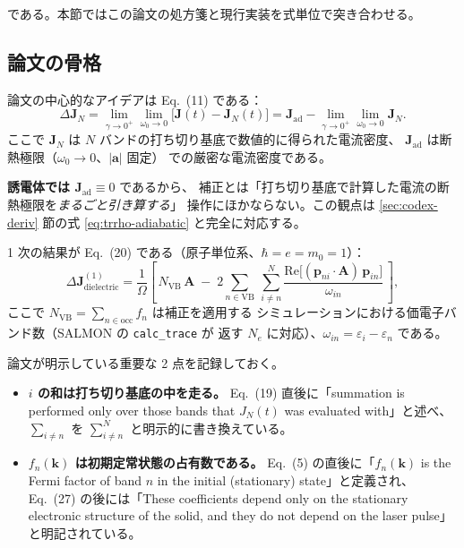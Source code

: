 \documentclass[dvipdfmx,a4paper,11pt]{jsarticle}
\newcommand{\vk}{\bm{k}}
\newcommand{\vA}{\bm{A}}
\newcommand{\vp}{\bm{p}}
\newcommand{\Real}{\mathrm{Re}}
\newcommand{\eps}{\varepsilon}
\begin{document}
である。本節ではこの論文の処方箋と現行実装を式単位で突き合わせる。

\subsection{論文の骨格}

論文の中心的なアイデアは Eq.~(11) である：
%
\begin{equation}
  \Delta \mathbf{J}_N
  = \lim_{\gamma\to0^+}\lim_{\omega_0\to0}\bigl[\mathbf{J}(t) - \mathbf{J}_N(t)\bigr]
  = \mathbf{J}_{\mathrm{ad}} - \lim_{\gamma\to0^+}\lim_{\omega_0\to0}\mathbf{J}_N .
  \label{eq:vlad-11}
\end{equation}
%
ここで $\mathbf{J}_N$ は $N$ バンドの打ち切り基底で数値的に得られた電流密度、
$\mathbf{J}_{\mathrm{ad}}$ は断熱極限（$\omega_0\to0$、$|\mathbf{a}|$ 固定）
での厳密な電流密度である。

\textbf{誘電体では $\mathbf{J}_{\mathrm{ad}}\equiv 0$} であるから、
補正とは「打ち切り基底で計算した電流の断熱極限を\emph{まるごと引き算する}」
操作にほかならない。この観点は
\ref{sec:codex-deriv} 節の式 \eqref{eq:trrho-adiabatic} と完全に対応する。

1 次の結果が Eq.~(20) である（原子単位系、$\hbar=e=m_0=1$）：
%
\begin{equation}
  \Delta \mathbf{J}^{(1)}_{\mathrm{dielectric}}
  = \frac{1}{\Omega}\left[\,
      N_{\mathrm{VB}}\,\vA
      \;-\; 2\sum_{n\in\mathrm{VB}}\ \sum_{i\neq n}^{N}
        \frac{\Real\bigl[(\vp_{ni}\cdot\vA)\,\vp_{in}\bigr]}{\omega_{in}}
    \,\right],
  \label{eq:vlad-20}
\end{equation}
%
ここで $N_{\mathrm{VB}}=\sum_{n\in\mathrm{occ}}f_n$ は補正を適用する
シミュレーションにおける価電子バンド数（SALMON の \verb|calc_trace| が
返す $N_e$ に対応）、$\omega_{in}=\eps_i-\eps_n$ である。

論文が明示している重要な 2 点を記録しておく。

\begin{itemize}
\item \textbf{$i$ の和は打ち切り基底の中を走る。}
      Eq.~(19) 直後に「summation is performed only over those bands that
      $J_N(t)$ was evaluated with」と述べ、
      $\sum_{i\neq n}$ を $\sum^{N}_{i\neq n}$ と明示的に書き換えている。
\item \textbf{$f_n(\vk)$ は初期定常状態の占有数である。}
      Eq.~(5) の直後に「$f_n(\vk)$ is the Fermi factor of band $n$ in the
      initial (stationary) state」と定義され、
      Eq.~(27) の後には「These coefficients depend only on the stationary
      electronic structure of the solid, and they do not depend on the laser
      pulse」と明記されている。
\end{itemize}
\end{document}
